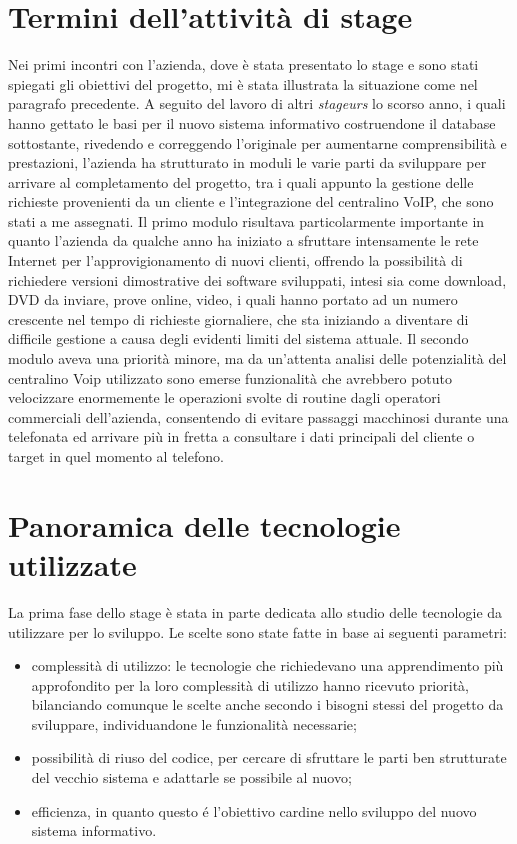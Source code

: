 \section{Termini dell'attivit\` a di stage}
Nei primi incontri con l'azienda, dove \` e stata presentato lo stage e sono
stati spiegati gli obiettivi del progetto, mi \` e stata illustrata la
situazione come nel paragrafo precedente. A seguito del lavoro di altri
\textit{stageurs} lo scorso anno, i quali hanno gettato le basi per il nuovo
sistema informativo costruendone il database sottostante, rivedendo e
correggendo l'originale per aumentarne comprensibilit\` a e prestazioni,
l'azienda ha strutturato in moduli le varie parti da sviluppare per arrivare al
completamento del progetto, tra i quali appunto la gestione delle richieste
provenienti da un cliente e l'integrazione del centralino VoIP, che sono stati a
me assegnati. Il primo modulo risultava particolarmente importante in quanto
l'azienda da qualche anno ha iniziato a sfruttare intensamente le rete Internet
per l'approvigionamento di nuovi clienti, offrendo la possibilit\` a di
richiedere versioni dimostrative dei software sviluppati, intesi sia come
download, DVD da inviare, prove online, video, i quali hanno portato ad un
numero crescente nel tempo di richieste giornaliere, che sta iniziando a
diventare di difficile gestione a causa degli evidenti limiti del sistema
attuale. Il secondo modulo aveva una priorit\` a minore, ma da un'attenta
analisi delle potenzialit\` a del centralino Voip utilizzato sono emerse
funzionalit\` a che avrebbero potuto velocizzare enormemente le operazioni
svolte di routine dagli operatori commerciali dell'azienda, consentendo di
evitare passaggi macchinosi durante una telefonata ed arrivare pi\` u in fretta
a consultare i dati principali del cliente o target in quel momento al telefono.


\section{Panoramica delle tecnologie utilizzate}
La prima fase dello stage \`e stata in parte dedicata allo studio delle tecnologie da utilizzare per lo sviluppo.
Le scelte sono state fatte in base ai seguenti parametri:
\begin{itemize}
  \item complessit\`a di utilizzo: le tecnologie che richiedevano una apprendimento pi\`u approfondito per la loro 
  complessit\`a di utilizzo hanno ricevuto priorit\`a, bilanciando comunque le scelte anche secondo i bisogni stessi del
progetto da sviluppare, individuandone le funzionalit\`a necessarie;
  \item possibilit\`a di riuso del codice, per cercare di sfruttare le parti ben strutturate del vecchio sistema e adattarle se possibile al
nuovo;
  \item efficienza, in quanto questo \'e l'obiettivo cardine nello sviluppo del nuovo sistema informativo.

\end{itemize}

